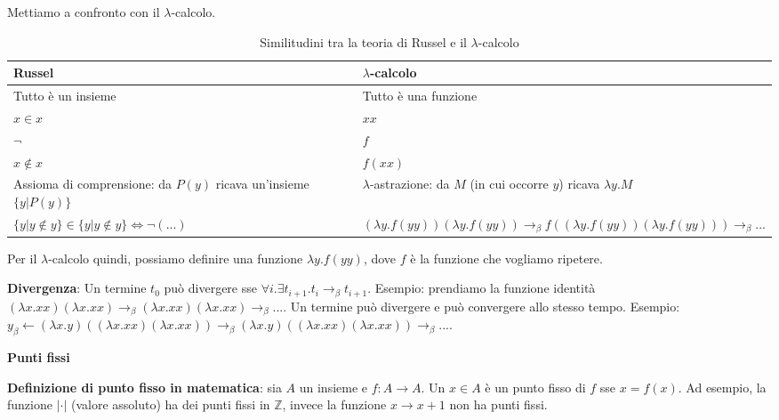 \documentclass{article}
\begin{document}
Mettiamo a confronto con il $\lambda$-calcolo.

\begin{table}[!ht]
    \centering
    \begin{tabularx}{\textwidth}{|X|X|}
        \hline \textbf{Russel} & \textbf{$\lambda$-calcolo} \\ \hline
        Tutto è un insieme & Tutto è una funzione \\ \hline
        $x\in x$ & $xx$\\\hline
        $\lnot$ & $f$ \\\hline
        $x\not\in x$ & $f(xx)$\\\hline
        Assioma di comprensione: da {\color{red}$P(y)$} ricava un'insieme {\color{red}$\{y|P(y)\}$} & $\lambda$-astrazione: da {\color{red}$M$} (in cui occorre $y$) ricava {\color{red}$\lambda y.M$} \\\hline
        $\{y|y\not \in y\} \in \{y|y\not\in y\} \iff \lnot (...)$ & $(\lambda y.f(yy))(\lambda y.f(yy)) \to_\beta f((\lambda y.f(yy))(\lambda y.f(yy))) \to_\beta ...$  \\\hline
    \end{tabularx}
    \caption{Similitudini tra la teoria di Russel e il $\lambda$-calcolo}
    \label{tab:simrusslam}
\end{table}

Per il $\lambda$-calcolo quindi, possiamo definire una funzione $\lambda y.f(yy)$, dove $f$ è la funzione che vogliamo ripetere. 

\bigskip

\noindent \textbf{Divergenza}: Un termine $t_0$ {\color{red}può divergere} sse $\forall i.\exists t_{i+1}.t_i \to_\beta t_{i+1}$. Esempio: prendiamo la funzione identità $(\lambda x.xx)(\lambda x.xx) \to_\beta(\lambda x.xx)(\lambda x.xx) \to_\beta ...$. Un termine può divergere e può convergere allo stesso tempo. Esempio: $y_\beta\leftarrow(\lambda x.y)((\lambda x.xx)(\lambda x.xx)) \to_\beta(\lambda x.y)((\lambda x.xx)(\lambda x.xx))\to_\beta ...$.

\bigskip
\bigskip

\noindent \textbf{Punti fissi}

\bigskip

\textbf{Definizione di punto fisso in matematica}: sia $A$ un insieme e $f : A \to A$. Un {\color{red}$x\in A$ è un punto fisso di $f$ sse $x = f(x)$}. Ad esempio, la funzione $|\cdot|$ (valore assoluto) ha dei punti fissi in $\mathbb{Z}$, invece la funzione $x \to x + 1$ non ha punti fissi.
\end{document}
